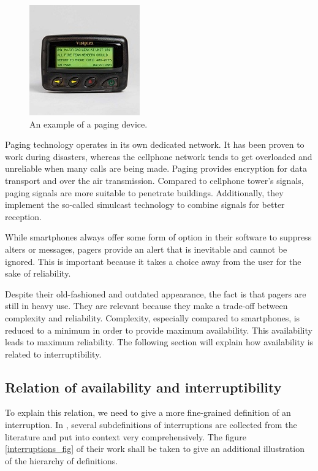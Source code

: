 \documentclass{CML_Seminar_Template}
\begin{document}
\begin{figure}[htb]
  \begin{center}
   \includegraphics{pager_small.jpg}
  \end{center}
    \caption{\label{pager_fig1} An example of a paging device.}
\end{figure}

Paging technology operates in its own dedicated network. It has been proven to work during disasters, whereas the cellphone network tends to get overloaded and unreliable when many calls are being made. Paging provides encryption for data transport and over the air transmission. Compared to cellphone tower's signals, paging signals are more suitable to penetrate buildings. Additionally, they implement the so-called simulcast technology to combine signals for better reception.
\par
While smartphones always offer some form of option in their software to suppress alters or messages, pagers provide an alert that is inevitable and cannot be ignored. This is important because it takes a choice away from the user for the sake of reliability.
\par
Despite their old-fashioned and outdated appearance, the fact is that pagers are still in heavy use. They are relevant because they make a trade-off between complexity and reliability. Complexity, especially compared to smartphones, is reduced to a minimum in order to provide maximum availability. This availability leads to maximum reliability. The following section will explain how availability is related to interruptibility.

\subsection{Relation of availability and interruptibility}
To explain this relation, we need to give a more fine-grained definition of an interruption. In \cite[]{Fetter2018}, several subdefinitions of interruptions are collected from the literature and put into context very comprehensively. The figure \ref{interruptions_fig} of their work shall be taken to give an additional illustration of the hierarchy of definitions.
\end{document}
